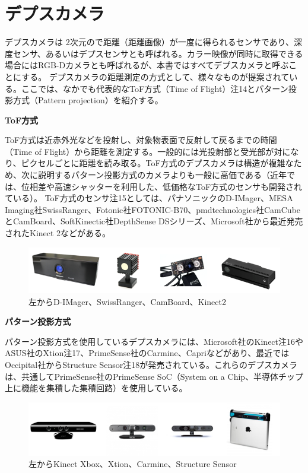 \section{デプスカメラ}

デプスカメラは 2次元ので距離（距離画像）が一度に得られるセンサであり、深度センサ、あるいはデプスセンサとも呼ばれる。カラー映像が同時に取得できる場合にはRGB-Dカメラとも呼ばれるが、本書ではすべてデプスカメラと呼ぶことにする。
デプスカメラの距離測定の方式として、様々なものが提案されている。ここでは、なかでも代表的なToF方式（Time of Flight）注14とパターン投影方式（Pattern projection）を紹介する。

\textbf{ ToF方式}

ToF方式は近赤外光などを投射し、対象物表面で反射して戻るまでの時間（Time of Flight）から距離を測定する。一般的には光投射部と受光部が対になり、ピクセルごとに距離を読み取る。ToF方式のデプスカメラは構造が複雑なため、次に説明するパターン投影方式のカメラよりも一般に高価である（近年では、位相差や高速シャッターを利用した、低価格なToF方式のセンサも開発されている）。
ToF方式のセンサ注15としては、パナソニックのD-IMager、MESA Imaging社SwissRanger、Fotonic社FOTONIC-B70、pmdtechnologies社CamCubeとCamBoard、SoftKinectic社DepthSense DSシリーズ、Microsoft社から最近発売されたKinect 2などがある。

\begin{figure}[ht]
  \centering
  \includegraphics[width=\columnwidth]{pictures/chapter8/pic_08_13.png}
  \caption{左からD-IMager、SwissRanger、CamBoard、Kinect2}
\end{figure}

\textbf{パターン投影方式}

パターン投影方式を使用しているデプスカメラには、Microsoft社のKinect注16やASUS社のXtion注17、PrimeSense社のCarmine、Capriなどがあり、最近ではOccipital社からStructure Sensor注18が発売されている。これらのデプスカメラは、共通してPrimeSense社のPrimeSense SoC（System on a Chip、半導体チップ上に機能を集積した集積回路）を使用している。

\begin{figure}[ht]
  \centering
  \includegraphics[width=\columnwidth]{pictures/chapter8/pic_08_14.png}
  \caption{左からKinect Xbox、Xtion、Carmine、Structure Sensor}
\end{figure}


